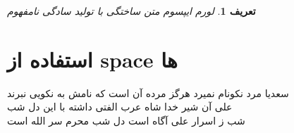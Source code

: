 \documentclass[12pt]{book}
\newtheorem{define}{تعریف}[chapter] %
\begin{document}
\begin{define}
	لورم ایپسوم متن ساختگی با تولید سادگی نامفهوم
\end{define}

\chapter{استفاده از space ها}

\begin{flushright}
	
	سعدیا مرد نکونام نمیرد هرگز  \hspace{2cm}
	مرده آن است که نامش به نکویی نبرند\\
	\vspace{1.5cm}
	علی آن شیر خدا شاه عرب  \hspace{2cm}
	الفتی داشته با این دل شب\\
	\vspace{1.5cm}
	شب ز اسرار علی آگاه است  \hspace{2cm}
	دل شب محرم سر الله است\\
\end{flushright}
\end{document}
